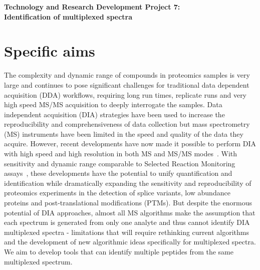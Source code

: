 \documentclass[arial,11pt]{article}
\begin{document}
\begin{center}
{\Large {\bf Technology and Research Development Project 7: \\
Identification of multiplexed spectra}}
\end{center}

\section{Specific aims}
The complexity and dynamic range of compounds in proteomics samples is very large and continues to pose significant challenges for traditional data dependent acquisition (DDA) workflows, requiring long run times, replicate runs and very high speed MS/MS acquisition to deeply interrogate the samples. Data independent acquisition (DIA) strategies have been used to increase the reproducibility and comprehensiveness of data collection but mass spectrometry (MS) instruments have been limited in the speed and quality of the data they acquire. However, recent developments  have now made it possible to perform DIA with high speed and high resolution in  both MS and MS/MS modes~\cite{chakraborty2007uim,Gillet12targeted}. With sensitivity and dynamic range comparable to Selected Reaction Monitoring assays~\cite{Gillet12targeted}, these developments have the potential to unify quantification and identification while dramatically expanding the sensitivity and reproducibility of proteomics experiments in the detection of splice variants, low abundance proteins and post-translational modifications (PTMs). But despite the enormous potential of DIA approaches, almost all MS algorithms make the assumption that each spectrum is generated from only one analyte and thus cannot identify DIA multiplexed spectra - limitations that will require rethinking current algorithms and the development of new algorithmic ideas specifically for multiplexed spectra. We aim to develop tools that can identify multiple peptides from the same multiplexed spectrum.
\end{document}
